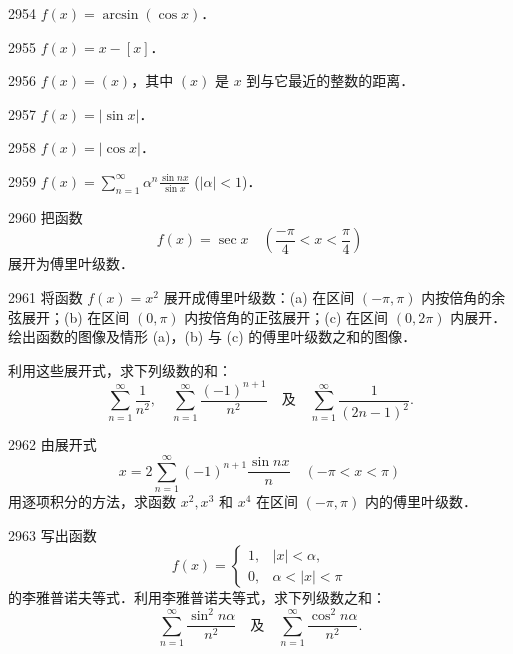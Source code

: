 \begin{prob}[S]{2954}
$f(x) = \arcsin(\cos x)$．
\end{prob}

\begin{prob}[S]{2955}
$f(x) = x - [x]$．
\end{prob}

\begin{prob}[S]{2956}
$f(x) = (x)$，其中 $(x)$ 是 $x$ 到与它最近的整数的距离．
\end{prob}

\begin{prob}[S]{2957}
$f(x) = |\sin x|$．
\end{prob}

\begin{prob}[S]{2958}
$f(x) = |\cos x|$．
\end{prob}

\begin{prob}[S]{2959}
$\displaystyle f(x) = \sum_{n=1}^{\infty} \alpha^n \frac{\sin nx}{\sin x}$ ($|\alpha| < 1$)．
\end{prob}

\begin{prob}[M]{2960}
把函数
\[
f(x) = \sec x \quad \left(\frac{-\pi}{4} < x < \frac{\pi}{4}\right)
\]
展开为傅里叶级数．
\end{prob}

\begin{prob}[L]{2961}
将函数 $f(x) = x^2$ 展开成傅里叶级数：(a) 在区间 $(-\pi, \pi)$ 内按倍角的余弦展开；(b) 在区间 $(0, \pi)$ 内按倍角的正弦展开；(c) 在区间 $(0, 2\pi)$ 内展开．绘出函数的图像及情形 (a)，(b) 与 (c) 的傅里叶级数之和的图像．

利用这些展开式，求下列级数的和：
\[
\sum_{n=1}^{\infty} \frac{1}{n^2}, \quad \sum_{n=1}^{\infty} \frac{(-1)^{n+1}}{n^2} \quad \text{及} \quad \sum_{n=1}^{\infty} \frac{1}{(2n - 1)^2}.
\]
\end{prob}

\begin{prob}[M]{2962}
由展开式
\[
x = 2\sum_{n=1}^{\infty} (-1)^{n+1} \frac{\sin nx}{n} \quad (-\pi < x < \pi)
\]
用逐项积分的方法，求函数 $x^2, x^3$ 和 $x^4$ 在区间 $(-\pi, \pi)$ 内的傅里叶级数．
\end{prob}

\begin{prob}[L]{2963}
写出函数
\[
f(x) = \begin{cases} 1, & |x| < \alpha, \\ 0, & \alpha < |x| < \pi \end{cases}
\]
的李雅普诺夫等式．利用李雅普诺夫等式，求下列级数之和：
\[
\sum_{n=1}^{\infty} \frac{\sin^2 n\alpha}{n^2} \quad \text{及} \quad \sum_{n=1}^{\infty} \frac{\cos^2 n\alpha}{n^2}.
\]
\end{prob}

